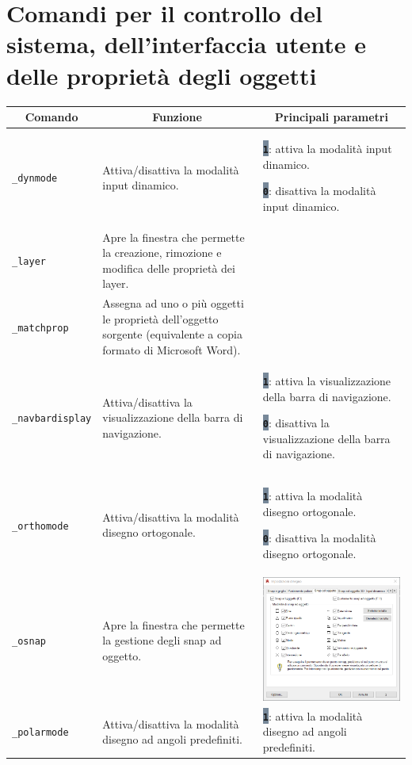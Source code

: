 \documentclass[..]{../IEEEphot}
\newcommand{\param}[1]{\colorbox{LightSlateGray}{\color{Navy}\texttt{\textbf{#1}}}}
\begin{document}
\section{Comandi per il controllo del sistema, dell'interfaccia utente e delle proprietà degli oggetti}
\begin{center}
\begin{longtable}{m{.2\linewidth}m{.33\linewidth}m{.33\linewidth}}
\toprule
    \multicolumn{1}{c}{\bfseries Comando} &
    \multicolumn{1}{c}{\bfseries Funzione} &
    \multicolumn{1}{c}{\bfseries Principali parametri} \\
\midrule
\texttt{\_dynmode} & Attiva/disattiva la modalità input dinamico. & 
\param{1}: attiva la modalità input dinamico.

\param{0}: disattiva la modalità input dinamico.
\\
\midrule
\texttt{\_layer} & Apre la finestra che permette la creazione, rimozione e modifica delle proprietà dei layer. & 
\\
\midrule
\texttt{\_matchprop} & Assegna ad uno o più oggetti le proprietà dell'oggetto sorgente (equivalente a copia formato di Microsoft Word). & 
\\
\midrule
\texttt{\_navbardisplay} & Attiva/disattiva la visualizzazione della barra di navigazione. & 
\param{1}: attiva la visualizzazione della barra di navigazione.

\param{0}: disattiva la visualizzazione della barra di navigazione.
\\
\midrule
\texttt{\_orthomode} & Attiva/disattiva la modalità disegno ortogonale. & 
\param{1}: attiva la modalità disegno ortogonale.

\param{0}: disattiva la modalità disegno ortogonale.
\\
\midrule
\texttt{\_osnap} & Apre la finestra che permette la gestione degli snap ad oggetto. & \includegraphics[width = 0.8\linewidth, keepaspectratio]{../images/png/_osnap.png}
\\
\midrule
\texttt{\_polarmode} & Attiva/disattiva la modalità disegno ad angoli predefiniti. & 
\param{1}: attiva la modalità disegno ad angoli predefiniti.


\end{longtable}
\end{center}
\end{document}
